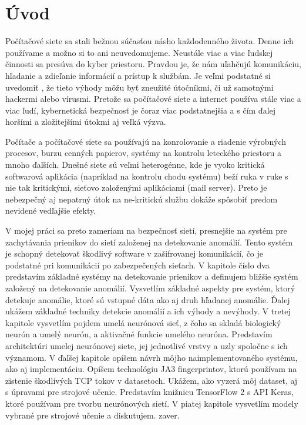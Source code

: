 \chapter{Úvod}

Počítačové siete sa stali bežnou súčasťou násho každodenného života. Denne ich používame a možno si to ani neuvedomujeme. Neustále viac a viac ľudskej činnosti sa presúva do kyber priestoru. Pravdou je, že nám uľahčujú komunikáciu, hľadanie a zdieľanie informácií a prístup k službám. Je veľmi podstatné si uvedomiť , že tieto výhody môžu byť zneužité útočníkmi, či už samotnými hackermi alebo vírusmi. Pretože sa počítačové siete a internet používa stále viac a viac ľudí, kybernetická bezpečnosť je čoraz viac podstatnejšia a s čím ďalej horšími a zložitejšími útokmi aj veľká výzva. \par
Počítače a počítačové siete sa používajú na konrolovanie a riadenie výrobných procesov, burzu cenných papierov, systémy na kontrolu leteckého priestoru a mnoho ďaľších. Dnešné siete sú veľmi heterogénne, kde je vyoko kritická softwarová aplikácia (napríklad na kontrolu chodu systému) beží ruka v ruke s nie tak kritickými, sieťovo založenými aplikáciami (mail server). Preto je nebezpečný aj nepatrný útok na ne-kritickú službu dokáže spôsobiť predom nevidené vedľajšie efekty. \cite{cyber} \par

V mojej práci sa preto zameriam na bezpečnosť sietí, presnejšie na systém pre zachytávania prienikov do sietí založenej na detekovanie anomálií. Tento systém je schopný detekovať škodlivý software v zašifrovanej komunikácií, čo je podstatné pri komunikácií po zabezpečených sieťach. V kapitole číslo dva predstavím základné systémy na detekovanie prienikov a definujem bližšie systém založený na detekovanie anomálií. Vysvetlím základné aspekty pre systém, ktorý detekuje anomálie, ktoré sú vstupné dáta ako aj druh hľadanej anomálie.  Ďalej ukážem základné techniky detekcie anomálií a ich výhody a nevýhody. V tretej kapitole vysvetlím pojdem umelá neurónová sieť, z čoho sa skladá biologický neurón a umelý neurón, a aktivačné funkcie umelého neuróna. Predstavím architektúri umelej neurónovej siete, jej jednotlivé vrstvy a uzly spoločne s ich významom. V ďaľšej kapitole opíšem návrh môjho naimplementovaného systému, ako aj implementáciu. Opíšem technológiu JA3 fingerprintov, ktorú používam na zistenie škodlivých TCP tokov v datasetoch. Ukážem, ako vyzerá môj dataset, aj s úpravami pre strojové učenie. Predstavím knižnicu TensorFlow 2 s API Keras, ktoré používam pre tvorbu neurónových  sietí. V piatej kapitole vysvetlím modely vybrané pre strojové učenie a diskutujem. zaver.



